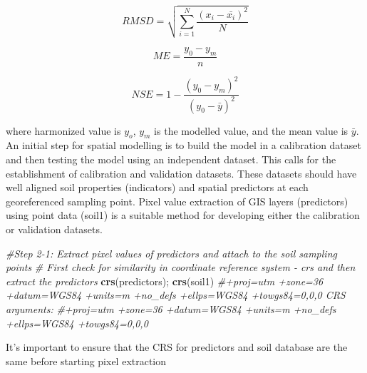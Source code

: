 \documentclass[
  10pt,
  b5paper,
]{book}
\newenvironment{Shaded}{\begin{snugshade}}{\end{snugshade}}
\newcommand{\CommentTok}[1]{\textcolor[rgb]{0.56,0.35,0.01}{\textit{#1}}}
\newcommand{\KeywordTok}[1]{\textcolor[rgb]{0.13,0.29,0.53}{\textbf{#1}}}
\newcommand{\NormalTok}[1]{#1}
\begin{document}
\begin{equation}
\tag{5.2}
RMSD =  \sqrt{\sum_{i=1}^N \frac{(x_i -\bar{x_i})^2}N}
\end{equation}

\begin{equation}
\tag{5.3}
ME = \frac{y_0 - y_m}n
\end{equation}

\begin{equation}
\tag{5.4}
NSE = 1 - \frac{(y_0-y_m)^2}{(y_0 -\bar{y})^2}
\end{equation}

where harmonized value is \(y_o\), \(y_m\) is the modelled value, and the mean value is \(\bar{y}\).
An initial step for spatial modelling is to build the model in a calibration dataset and then testing the model using an independent dataset. This calls for the establishment of calibration and validation datasets. These datasets should have well aligned soil properties (indicators) and spatial predictors at each georeferenced sampling point. Pixel value extraction of GIS layers (predictors) using point data (soil1) is a suitable method for developing either the calibration or validation datasets.

\begin{Shaded}
\begin{Highlighting}[]
\CommentTok{#Step 2-1: Extract pixel values of predictors and attach to the soil sampling points}
\CommentTok{# First check for similarity in coordinate reference system - crs and then extract the predictors}
\KeywordTok{crs}\NormalTok{(predictors); }\KeywordTok{crs}\NormalTok{(soil1) }
\CommentTok{#+proj=utm +zone=36 +datum=WGS84 +units=m +no_defs +ellps=WGS84 +towgs84=0,0,0 CRS arguments:}
\CommentTok{#+proj=utm +zone=36 +datum=WGS84 +units=m +no_defs +ellps=WGS84 +towgs84=0,0,0}
\end{Highlighting}
\end{Shaded}

It's important to ensure that the CRS for predictors and soil database are the same before starting pixel extraction
\end{document}
